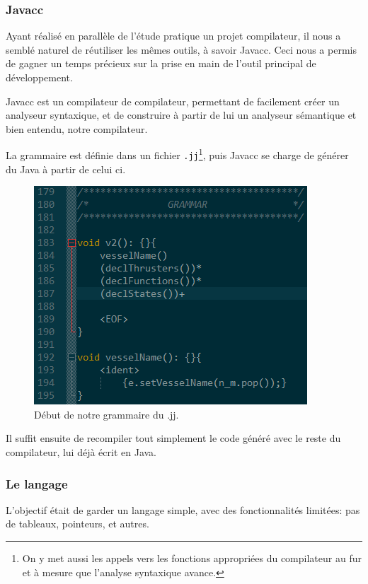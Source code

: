 \documentclass[a4paper,11pt]{article}
\begin{document}
    \subsubsection{Javacc}
        Ayant réalisé en parallèle de l'étude pratique un projet compilateur, il nous a semblé naturel de réutiliser les mêmes outils, à savoir Javacc. Ceci nous a permis de gagner un temps précieux sur la prise en main de l'outil principal de développement.

        Javacc est un compilateur de compilateur, permettant de facilement créer un analyseur syntaxique, et de construire à partir de lui un analyseur sémantique et bien entendu, notre compilateur.
        
        La grammaire est définie dans un fichier \verb|.jj|\footnote{On y met aussi les appels vers les fonctions appropriées du compilateur au fur et à mesure que l'analyse syntaxique avance.}, puis Javacc se charge de générer du Java à partir de celui ci.
        
        \begin{figure}[!h]
            \begin{center}
                \includegraphics{img/grammar_jj.png}
                \caption{Début de notre grammaire du .jj.}
            \end{center}
        \end{figure}
        
        Il suffit ensuite de recompiler tout simplement le code généré avec le reste du compilateur, lui déjà écrit en Java.

    \subsubsection{Le langage}
        L'objectif était de garder un langage simple, avec des fonctionnalités limitées: pas de tableaux, pointeurs, et autres.
\end{document}
